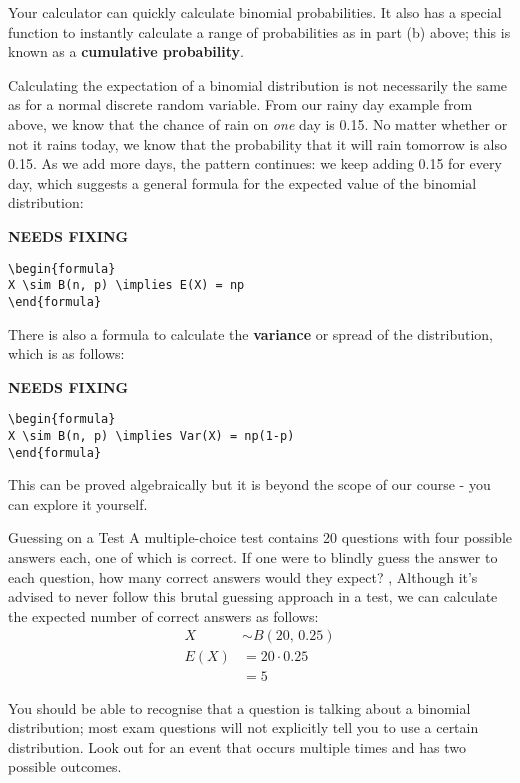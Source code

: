 Your calculator can quickly calculate binomial probabilities. It also has a special function to instantly calculate a range of probabilities as in part (b) above; this is known as a \textbf{cumulative probability}.

Calculating the expectation of a binomial distribution is not necessarily the same as for a normal discrete random variable. From our rainy day example from above, we know that the chance of rain on \textit{one} day is 0.15. No matter whether or not it rains today, we know that the probability that it will rain tomorrow is also 0.15. As we add more days, the pattern continues: we keep adding 0.15 for every day, which suggests a general formula for the expected value of the binomial distribution:

{\hfill\Large\bfseries NEEDS FIXING\hfill}
\begin{lstlisting}
\begin{formula}
X \sim B(n, p) \implies E(X) = np
\end{formula}
 \end{lstlisting}

There is also a formula to calculate the \textbf{variance} or spread of the distribution, which is as follows:

{\hfill\Large\bfseries NEEDS FIXING\hfill}
\begin{lstlisting}
\begin{formula}
X \sim B(n, p) \implies Var(X) = np(1-p)
\end{formula}
 \end{lstlisting}

This can be proved algebraically but it is beyond the scope of our course - you can explore it yourself.
\begin{example}{Guessing on a Test}
A multiple-choice test contains 20 questions with four possible answers each, one of which is correct. If one were to blindly guess the answer to each question, how many correct answers would they expect?
\sep
Although it's advised to never follow this brutal guessing approach in a test, we can calculate the expected number of correct answers as follows:
\begin{align}
    X &\sim B(20, \, 0.25) \\
    E(X) &= 20 \cdot 0.25 \\
    &= 5
\end{align}
\end{example}

You should be able to recognise that a question is talking about a binomial distribution; most exam questions will not explicitly tell you to use a certain distribution. Look out for an event that occurs multiple times and has two possible outcomes.

